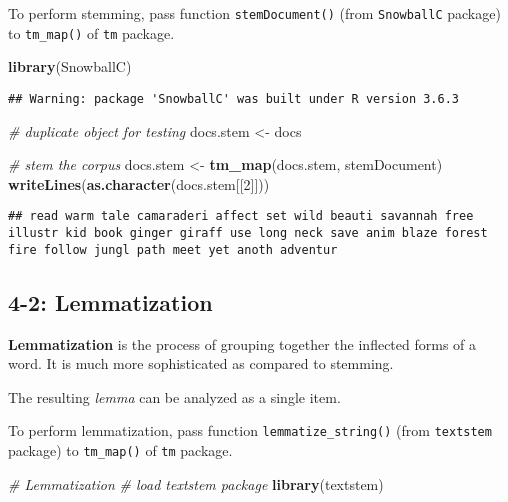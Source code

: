 \documentclass[
]{article}
\newenvironment{Shaded}{\begin{snugshade}}{\end{snugshade}}
\newcommand{\CommentTok}[1]{\textcolor[rgb]{0.56,0.35,0.01}{\textit{#1}}}
\newcommand{\DecValTok}[1]{\textcolor[rgb]{0.00,0.00,0.81}{#1}}
\newcommand{\KeywordTok}[1]{\textcolor[rgb]{0.13,0.29,0.53}{\textbf{#1}}}
\newcommand{\NormalTok}[1]{#1}
\newcommand{\StringTok}[1]{\textcolor[rgb]{0.31,0.60,0.02}{#1}}
\begin{document}
To perform stemming, pass function \texttt{stemDocument()} (from
\texttt{SnowballC} package) to \texttt{tm\_map()} of \texttt{tm}
package.

\begin{Shaded}
\begin{Highlighting}[]
\KeywordTok{library}\NormalTok{(SnowballC)}
\end{Highlighting}
\end{Shaded}

\begin{verbatim}
## Warning: package 'SnowballC' was built under R version 3.6.3
\end{verbatim}

\begin{Shaded}
\begin{Highlighting}[]
\CommentTok{# duplicate object for testing}
\NormalTok{docs.stem <-}\StringTok{ }\NormalTok{docs}

\CommentTok{# stem the corpus}
\NormalTok{docs.stem <-}\StringTok{ }\KeywordTok{tm_map}\NormalTok{(docs.stem, stemDocument)}
\KeywordTok{writeLines}\NormalTok{(}\KeywordTok{as.character}\NormalTok{(docs.stem[[}\DecValTok{2}\NormalTok{]]))}
\end{Highlighting}
\end{Shaded}

\begin{verbatim}
## read warm tale camaraderi affect set wild beauti savannah free illustr kid book ginger giraff use long neck save anim blaze forest fire follow jungl path meet yet anoth adventur
\end{verbatim}

\hypertarget{lemmatization}{%
\subsection{4-2: Lemmatization}\label{lemmatization}}

\textbf{Lemmatization} is the process of grouping together the inflected
forms of a word. It is much more sophisticated as compared to stemming.

The resulting \emph{lemma} can be analyzed as a single item.

To perform lemmatization, pass function \texttt{lemmatize\_string()}
(from \texttt{textstem} package) to \texttt{tm\_map()} of \texttt{tm}
package.

\begin{Shaded}
\begin{Highlighting}[]
\CommentTok{# Lemmatization}
\CommentTok{# load textstem package}
\KeywordTok{library}\NormalTok{(textstem)}
\end{Highlighting}
\end{Shaded}
\end{document}
